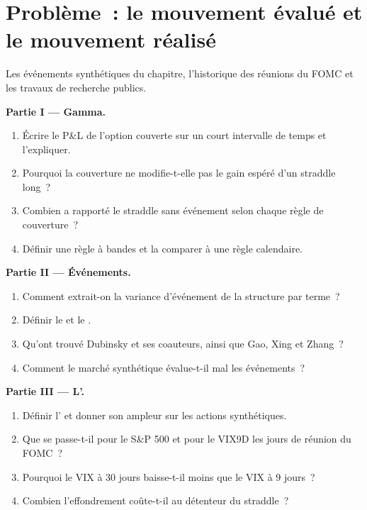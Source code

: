 \section{Problème~: le mouvement évalué et le mouvement réalisé}

\begin{problem}\label{pb:s2:gamma-scalping-and-event-volatility:1}
Les événements synthétiques du chapitre, l'historique des réunions du FOMC et les travaux de recherche publics.

\medskip\noindent\textbf{Partie I --- Gamma.}
\begin{enumerate}
\item Écrire le P\&L de l'option couverte sur un court intervalle de temps et l'expliquer.
\item Pourquoi la couverture ne modifie-t-elle pas le gain espéré d'un straddle long~?
\item Combien a rapporté le straddle sans événement selon chaque règle de couverture~?
\item Définir une règle à bandes et la comparer à une règle calendaire.
\end{enumerate}

\medskip\noindent\textbf{Partie II --- Événements.}
\begin{enumerate}[resume]
\item Comment extrait-on la variance d'événement de la structure par terme~?
\item Définir le  et le .
\item Qu'ont trouvé Dubinsky et ses coauteurs, ainsi que Gao, Xing et Zhang~?
\item Comment le marché synthétique évalue-t-il mal les événements~?
\end{enumerate}

\medskip\noindent\textbf{Partie III --- L'.}
\begin{enumerate}[resume]
\item Définir l' et donner son ampleur sur les actions synthétiques.
\item Que se passe-t-il pour le S\&P 500 et pour le VIX9D les jours de réunion du FOMC~?
\item Pourquoi le VIX à 30 jours baisse-t-il moins que le VIX à 9 jours~?
\item Combien l'effondrement coûte-t-il au détenteur du straddle~?
\end{enumerate}


\end{problem}
